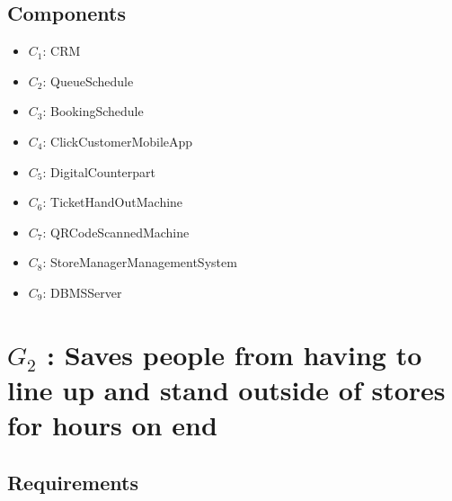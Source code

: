 \documentclass[a4paper,12pt]{report}
\begin{document}
\subsection{Components}
\begin{itemize}
	\item $C_1$: CRM
	\item $C_2$: QueueSchedule
	\item $C_3$: BookingSchedule
	\item $C_4$: ClickCustomerMobileApp
	\item $C_5$: DigitalCounterpart
	\item $C_6$: TicketHandOutMachine
	\item $C_7$: QRCodeScannedMachine
	\item $C_{8}$: StoreManagerManagementSystem
	\item $C_{9}$: DBMSServer
\end{itemize}


\section{$G_2$ : Saves people from having to line up and stand outside of stores for hours on end}

\subsection{Requirements}
\end{document}
